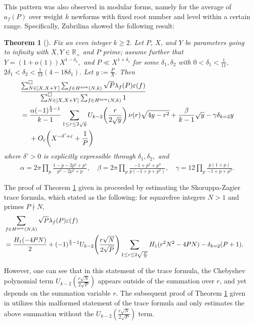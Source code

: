 \documentclass[12pt,letterpaper,reqno]{amsart}
\theoremstyle{plain}
\newtheorem{theorem}{Theorem}[section]
\theoremstyle{definition}
\numberwithin{equation}{section}
\numberwithin{figure}{section}
\numberwithin{table}{section}
\newcommand{\lrp}[1]{\!\left(#1\right)}
\newcommand{\new}{{\rm new}}
\begin{document}
This pattern was also observed in modular forms, namely for the average of $a_f(P)$ over weight $k$ newforms with fixed root number and level within a certain range. Specifically, Zubrilina \cite{Zubrilina} showed the following result:
\begin{theorem}[{\cite[Theorem 1]{Zubrilina}}] \label{thm:main-result} 
Fix an even integer $k\ge 2$. Let $P$, $X$, and $Y$ be parameters going to infinity with $X,Y\in \mathbb{R}_{+}$ and $P$ prime; assume further that $Y=(1+o(1))X^{1-\delta_2},$ and $P\ll X^{1+\delta_1}$ for some $\delta_1,\delta_2$ with $0<\delta_1<\frac{1}{11}$, $2\delta_1<\delta_2<\frac{1}{13} (4-18\delta_1).$ Let $y := \frac{P}{X}$. Then 
\begin{align}
    &\frac{
    \sum_{N\in[X,X+Y]}^\square \sum_{f\in H^{\rm new}(N,k)}\sqrt{P}\lambda_f(P)\varepsilon(f)
    }{
    \sum_{N\in[X,X+Y]}^\square \sum_{f\in H^{\rm new}(N,k)}1 
    }  \\
    &=\frac{\alpha(-1)^{\frac{k}{2}-1}}{k-1}\sum_{1\leq r\leq 2\sqrt{y}}U_{k-2}\lrp{\frac{r}{2\sqrt{y}}}\nu(r)\sqrt{4y-r^2} +\frac{\beta}{k-1}\sqrt{y}-\gamma \delta_{k=2}y  \\
    &\quad\ +O_\varepsilon\lrp{X^{-\delta'+\varepsilon}+\frac{1}{P}}
\end{align}
where $\delta'>0$ is explicitly expressible through $\delta_1,\delta_2,$ and 
\begin{align}
\alpha= 2\pi \prod_{p}\frac{1-p-2p^2+p^4}{p^4-2p^2+p}, \quad \beta=2\pi\prod_{p}\frac{-1+p^2+p^3}{p(-1+p+p^2)}, \quad 
\gamma=12\prod_{p}\frac{p(1+p)}{-1+p+p^2}.
\end{align}
\end{theorem}


The proof of Theorem \ref{thm:main-result} given in \cite{Zubrilina} proceeded by estimating the Skoruppa-Zagier trace formula, which \cite[Section 2]{Zubrilina} stated as the following: for squarefree integers $N > 1$ and primes $P\nmid N$,  
\begin{align}
    &\sum_{f \in H^\new(N,k)}\sqrt{P}\lambda_f(P)\varepsilon(f) \\
    &= \frac{H_1(-4PN)}{2} + (-1)^{\frac{k}{2}-1}U_{k-2}\lrp{\frac{r\sqrt{N}}{2\sqrt{P}}}\sum_{1 \le r \le 2\sqrt{\frac{P}{N}}}H_1(r^2N^2-4PN) - \delta_{k=2}(P+1). \quad
    \label{eqn:incorrect-Skoruppa-Zagier-trace-formula}
\end{align}



However, one can see that in this statement of the trace formula,
the Chebyshev polynomial term $U_{k-2}\lrp{\frac{r \sqrt N}{2 \sqrt P}}$ appears outside of the summation over $r$, and yet depends on the summation variable $r$. The subsequent proof of Theorem \ref{thm:main-result} given in \cite{Zubrilina} utilizes this malformed statement of the trace formula and only estimates the above summation without the $U_{k-2}\lrp{\frac{r \sqrt N}{2 \sqrt P}}$ term. 
\end{document}
